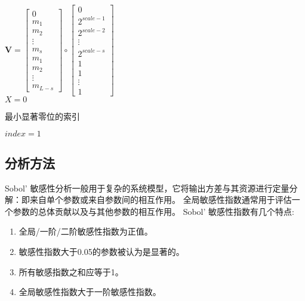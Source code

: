 \begin{algorithm}
{{{            }{
                $\mathbf{V} = \begin{bmatrix}0\\ m_1 \\ m_2 \\ \vdots\\ m_s \\ m_1 \\ m_2 \\ \vdots \\ m_{L - s} \end{bmatrix} \circ \begin{bmatrix}0\\ 2^{scale - 1} \\ 2^{scale - 2} \\ \vdots\\ 2^{scale - s} \\ 1 \\ 1 \\ \vdots \\ 1 \end{bmatrix}$\\
            }
        }
        $X = 0$\\
    }
\end{algorithm}

\begin{algorithm}
    \caption{最小显著零位的索引}
    $index = 1$\\
\end{algorithm}


\subsection{分析方法}

Sobol' 敏感性分析一般用于复杂的系统模型，它将输出方差与其资源进行定量分解：即来自单个参数或来自参数间的相互作用。%
全局敏感性指数通常用于评估一个参数的总体贡献以及与其他参数的相互作用。%
Sobol' 敏感性指数有几个特点:
\begin{enumerate}
    \item 全局/一阶/二阶敏感性指数为正值。
    \item 敏感性指数大于0.05的参数被认为是显著的。
    \item 所有敏感指数之和应等于1。
    \item 全局敏感性指数大于一阶敏感性指数。
\end{enumerate}

